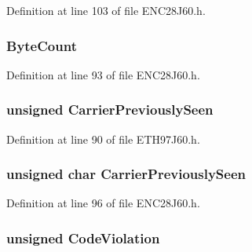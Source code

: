 Definition at line 103 of file E\+N\+C28\+J60.\+h.

\hypertarget{union_r_x_s_t_a_t_u_s_a27fd548a7b630a21bbd9a0760290ef93}{}
\subsubsection[{Byte\+Count}]{ Byte\+Count}\label{union_r_x_s_t_a_t_u_s_a27fd548a7b630a21bbd9a0760290ef93}


Definition at line 93 of file E\+N\+C28\+J60.\+h.

\hypertarget{union_r_x_s_t_a_t_u_s_a37281cc7462761aabc932bd2af1f798e}{}
\subsubsection[{Carrier\+Previously\+Seen}]{\setlength{\rightskip}{0pt plus 5cm}unsigned Carrier\+Previously\+Seen}\label{union_r_x_s_t_a_t_u_s_a37281cc7462761aabc932bd2af1f798e}


Definition at line 90 of file E\+T\+H97\+J60.\+h.

\hypertarget{union_r_x_s_t_a_t_u_s_ac20aa9c2985602a016cfcae7edb179f1}{}
\subsubsection[{Carrier\+Previously\+Seen}]{\setlength{\rightskip}{0pt plus 5cm}unsigned char Carrier\+Previously\+Seen}\label{union_r_x_s_t_a_t_u_s_ac20aa9c2985602a016cfcae7edb179f1}


Definition at line 96 of file E\+N\+C28\+J60.\+h.

\hypertarget{union_r_x_s_t_a_t_u_s_a0333d70d3aea6005113d250d5416e6e5}{}
\subsubsection[{Code\+Violation}]{\setlength{\rightskip}{0pt plus 5cm}unsigned Code\+Violation}\label{union_r_x_s_t_a_t_u_s_a0333d70d3aea6005113d250d5416e6e5}



